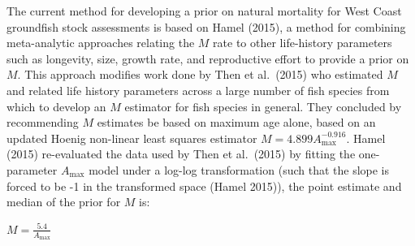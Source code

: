 \documentclass[11pt,
  english,
  a4paper,
]{article}
\begin{document}

The current method for developing a prior on natural mortality for West Coast groundfish stock assessments is based on Hamel {(2015)\leavevmode\tagmcend\tagstructend}, a method for combining meta-analytic approaches relating the {\(M\)\leavevmode\tagmcend\tagstructend} rate to other life-history parameters such as longevity, size, growth rate, and reproductive effort to provide a prior on {\(M\)\leavevmode\tagmcend\tagstructend}. This approach modifies work done by Then et al.~{(2015)\leavevmode\tagmcend\tagstructend} who estimated {\(M\)\leavevmode\tagmcend\tagstructend} and related life history parameters across a large number of fish species from which to develop an {\(M\)\leavevmode\tagmcend\tagstructend} estimator for fish species in general. They concluded by recommending {\(M\)\leavevmode\tagmcend\tagstructend} estimates be based on maximum age alone, based on an updated Hoenig non-linear least squares estimator {\(M = 4.899A^{-0.916}_{\text{max}}\)\leavevmode\tagmcend\tagstructend}. Hamel {(2015)\leavevmode\tagmcend\tagstructend} re-evaluated the data used by Then et al.~{(2015)\leavevmode\tagmcend\tagstructend} by fitting the one-parameter {\(A_{\text{max}}\)\leavevmode\tagmcend\tagstructend} model under a log-log transformation (such that the slope is forced to be -1 in the transformed space {(Hamel 2015)\leavevmode\tagmcend\tagstructend}), the point estimate and median of the prior for {\(M\)\leavevmode\tagmcend\tagstructend} is:

\leavevmode\tagmcend\tagstructend\par

\begin{centering}

$M=\frac{5.4}{A_{\text{max}}}$

\end{centering}
\end{document}
